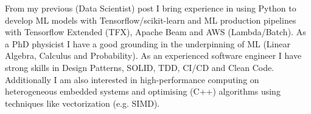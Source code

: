 \documentclass[11pt, a4paper]{awesome-cv}
\begin{document}
\begin{cvletter}
From my previous (Data Scientist) post I bring experience in using Python to develop ML models 
with Tensorflow/scikit-learn and ML production pipelines with Tensorflow Extended (TFX), 
Apache Beam and AWS (Lambda/Batch). As a PhD physicist I have a
good grounding in the underpinning of ML (Linear Algebra, Calculus and Probability). 
As an experienced software engineer I have strong skills in Design Patterns, SOLID, TDD, CI/CD and 
Clean Code. Additionally I am also interested in high-performance computing on heterogeneous 
embedded systems and optimising (C++) algorithms using techniques like 
vectorization (e.g. SIMD).


\end{cvletter}


\makeletterclosing
\end{document}
